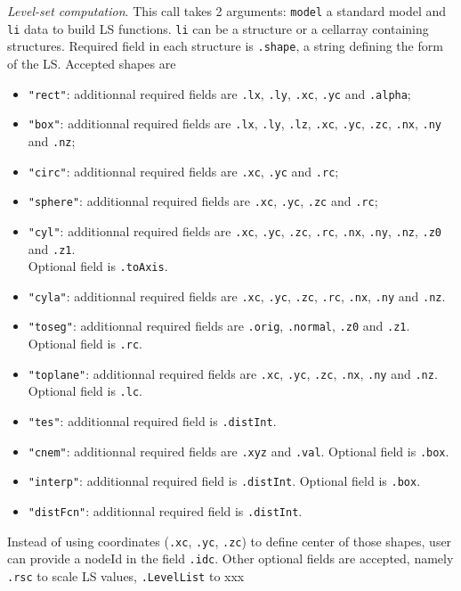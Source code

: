 {\sl Level-set computation}. This call takes 2 arguments: {\tt model} a standard model and {\tt li} data to build LS functions. {\tt li} can be  a structure or a cellarray containing structures. Required field in each structure is {\tt .shape}, a string defining the form of the LS. Accepted shapes are
\begin{itemize}
\item    {\tt  "rect"}: additionnal required fields are {\tt  .lx}, {\tt  .ly}, {\tt  .xc}, {\tt  .yc} and {\tt  .alpha};
\item    {\tt  "box"}: additionnal required fields are {\tt  .lx}, {\tt  .ly}, {\tt  .lz}, {\tt  .xc}, {\tt  .yc}, {\tt  .zc}, {\tt  .nx}, {\tt  .ny} and {\tt  .nz}; 
\item	{\tt  "circ"}: additionnal required fields are {\tt  .xc}, {\tt  .yc} and {\tt  .rc};
\item	{\tt  "sphere"}: additionnal required fields are {\tt  .xc}, {\tt  .yc}, {\tt  .zc} and {\tt  .rc}; 
\item	{\tt  "cyl"}: additionnal required fields are {\tt  .xc}, {\tt  .yc}, {\tt  .zc}, {\tt  .rc}, {\tt  .nx}, {\tt  .ny}, {\tt  .nz}, {\tt  .z0} and {\tt  .z1}.  \\Optional field is {\tt  .toAxis}.
\item	{\tt  "cyla"}: additionnal required fields are {\tt  .xc}, {\tt  .yc}, {\tt  .zc}, {\tt  .rc}, {\tt  .nx}, {\tt  .ny} and {\tt  .nz}.
\item	{\tt  "toseg"}: additionnal required fields are {\tt  .orig}, {\tt  .normal}, {\tt  .z0} and {\tt  .z1}. Optional field is {\tt  .rc}.
\item	{\tt  "toplane"}: additionnal required fields are {\tt  .xc}, {\tt  .yc}, {\tt  .zc}, {\tt  .nx}, {\tt  .ny} and {\tt  .nz}. \\Optional field is {\tt  .lc}.
\item	{\tt  "tes"}: additionnal required field is {\tt  .distInt}.
\item	{\tt  "cnem"}: additionnal required fields are {\tt  .xyz} and {\tt  .val}. Optional field is {\tt  .box}.
\item	{\tt  "interp"}: additionnal required field is {\tt  .distInt}. Optional field is {\tt  .box}.
\item	{\tt  "distFcn"}: additionnal required field is {\tt  .distInt}.
\end{itemize}
Instead of using coordinates ({\tt  .xc}, {\tt  .yc}, {\tt  .zc}) to define center of those shapes, user can provide a nodeId in the field {\tt  .idc}.
Other optional fields are accepted, namely {\tt  .rsc} to scale LS values, {\tt  .LevelList} to xxx


